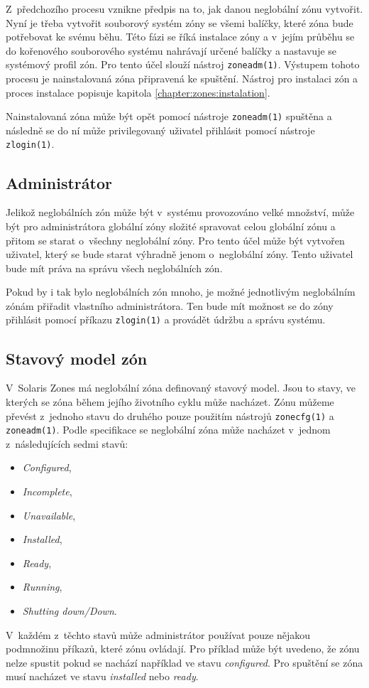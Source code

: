 Z~předchozího procesu vznikne předpis na to, jak danou neglobální zónu vytvořit. Nyní je třeba vytvořit souborový systém
zóny se všemi balíčky, které zóna bude potřebovat ke svému běhu. Této fázi se říká instalace zóny a v~jejím průběhu se do
kořenového souborového systému nahrávají určené balíčky a nastavuje se systémový profil zón. Pro tento účel slouží nástroj
\verb|zoneadm(1)|. Výstupem tohoto procesu je nainstalovaná zóna připravená ke spuštění. Nástroj pro instalaci zón
a proces instalace popisuje kapitola \ref{chapter:zones:instalation}.

Nainstalovaná zóna může být opět pomocí nástroje \verb|zoneadm(1)| spuštěna a následně se do ní může privilegovaný 
uživatel přihlásit pomocí nástroje \verb|zlogin(1)|.
\subsection{Administrátor}
\label{chapter:zones:administration:administrator}
Jelikož neglobálních zón může být v~systému provozováno velké množství, může být pro administrátora globální zóny složité spravovat 
celou globální zónu a přitom se starat o~všechny neglobální zóny. Pro tento účel může být vytvořen uživatel, který se bude
starat výhradně jenom o~neglobální zóny. Tento uživatel bude mít práva na správu všech neglobálních zón.

Pokud by i tak bylo neglobálních zón mnoho, je možné jednotlivým neglobálním zónám přiřadit vlastního administrátora. Ten
bude mít možnost se do zóny přihlásit pomocí příkazu \verb|zlogin(1)| a provádět údržbu a správu systému.
\subsection{Stavový model zón}
\label{chapter:zones:administration:states}
V~Solaris Zones má neglobální zóna definovaný stavový model. Jsou to stavy, ve kterých se zóna během jejího životního cyklu
může nacházet. Zónu můžeme převést z~jednoho stavu do druhého pouze použitím nástrojů \verb|zonecfg(1)| a
\verb|zoneadm(1)|. Podle specifikace \cite{oracle:solaris:zones:states} se neglobální zóna může nacházet v~jednom
z~následujících sedmi stavů:
\begin{itemize}
 \item \textit{Configured},
 \item \textit{Incomplete},
 \item \textit{Unavailable},
 \item \textit{Installed},
 \item \textit{Ready},
 \item \textit{Running},
 \item \textit{Shutting down/Down}.
\end{itemize}
V~každém z~těchto stavů může administrátor používat pouze nějakou podmnožinu příkazů, které zónu ovládají. Pro příklad
může být uvedeno, že zónu nelze spustit pokud se nachází například ve stavu \textit{configured}. Pro spuštění se zóna musí
nacházet ve stavu \textit{installed} nebo \textit{ready}.
